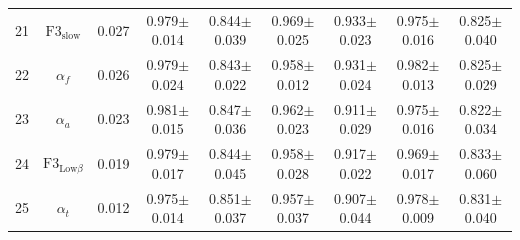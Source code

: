 \documentclass[pdflatex,sn-mathphys]{sn-jnl}%
\theoremstyle{thmstyleone}%
\theoremstyle{thmstyletwo}%
\theoremstyle{thmstylethree}%
\begin{document}
\begin{appendices}
\begin{table}[h!]
{\begin{tabular}{r|cccccccc}
  21 &       $\text{F3}_\text{slow}$ &  0.027 &          0.979$\pm$0.014 &          0.844$\pm$0.039 &          0.969$\pm$0.025 &          0.933$\pm$0.023 &          0.975$\pm$0.016 &          0.825$\pm$0.040 \\
  22 &                  $\alpha_{f}$ &  0.026 &          0.979$\pm$0.024 &          0.843$\pm$0.022 &          0.958$\pm$0.012 &          0.931$\pm$0.024 &          0.982$\pm$0.013 &          0.825$\pm$0.029 \\
  23 &                  $\alpha_{a}$ &  0.023 &          0.981$\pm$0.015 &          0.847$\pm$0.036 &          0.962$\pm$0.023 &          0.911$\pm$0.029 &          0.975$\pm$0.016 &          0.822$\pm$0.034 \\
  24 & $\text{F3}_{\text{Low}\beta}$ &  0.019 &          0.979$\pm$0.017 &          0.844$\pm$0.045 &          0.958$\pm$0.028 &          0.917$\pm$0.022 &          0.969$\pm$0.017 &          0.833$\pm$0.060 \\
  25 &                  $\alpha_{t}$ &  0.012 &          0.975$\pm$0.014 &          0.851$\pm$0.037 &          0.957$\pm$0.037 &          0.907$\pm$0.044 &          0.978$\pm$0.009 &          0.831$\pm$0.040 \\
\hline
\end{tabular}
}
\end{table}


\end{appendices}
\end{document}
